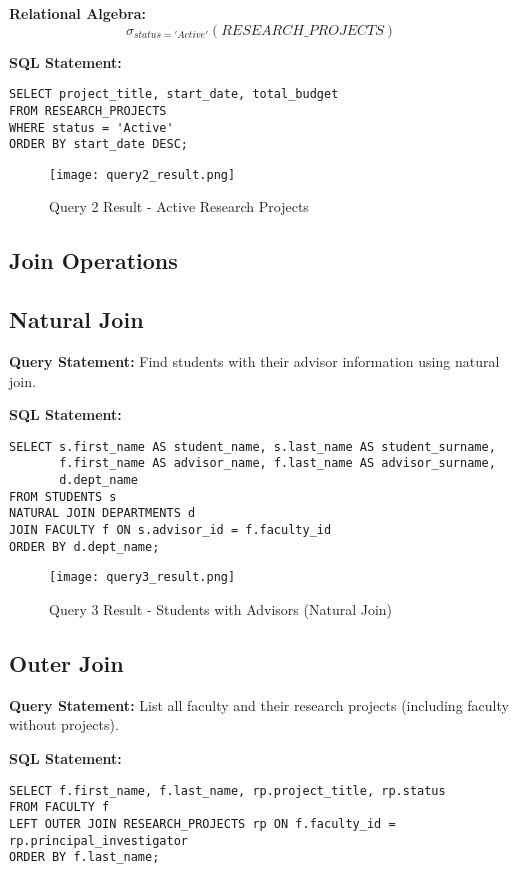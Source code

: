 \documentclass[12pt,a4paper]{article}
\begin{document}
\textbf{Relational Algebra:}
$$\sigma_{status='Active'}(RESEARCH\_PROJECTS)$$

\textbf{SQL Statement:}
\begin{lstlisting}[style=sqlstyle]
SELECT project_title, start_date, total_budget
FROM RESEARCH_PROJECTS
WHERE status = 'Active'
ORDER BY start_date DESC;
\end{lstlisting}

\begin{figure}[H]
    \centering
    \texttt{[image: query2\_result.png]}
    \caption{Query 2 Result - Active Research Projects}
\end{figure}

\subsection{Join Operations}

\subsection{Natural Join}
\textbf{Query Statement:} Find students with their advisor information using natural join.

\textbf{SQL Statement:}
\begin{lstlisting}[style=sqlstyle]
SELECT s.first_name AS student_name, s.last_name AS student_surname,
       f.first_name AS advisor_name, f.last_name AS advisor_surname,
       d.dept_name
FROM STUDENTS s
NATURAL JOIN DEPARTMENTS d
JOIN FACULTY f ON s.advisor_id = f.faculty_id
ORDER BY d.dept_name;
\end{lstlisting}

\begin{figure}[H]
    \centering
    \texttt{[image: query3\_result.png]}
    \caption{Query 3 Result - Students with Advisors (Natural Join)}
\end{figure}

\subsection{Outer Join}
\textbf{Query Statement:} List all faculty and their research projects (including faculty without projects).

\textbf{SQL Statement:}
\begin{lstlisting}[style=sqlstyle]
SELECT f.first_name, f.last_name, rp.project_title, rp.status
FROM FACULTY f
LEFT OUTER JOIN RESEARCH_PROJECTS rp ON f.faculty_id = rp.principal_investigator
ORDER BY f.last_name;
\end{lstlisting}
\end{document}
